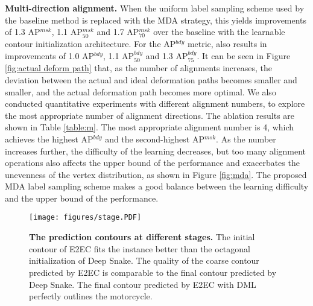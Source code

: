 \documentclass[10pt,twocolumn,letterpaper]{article}
\begin{document}
\textbf{Multi-direction alignment.} When the uniform label sampling scheme used by the baseline method is replaced with the MDA strategy, this yields improvements of 1.3 AP$^{msk}$, 1.1 AP$_{50}^{msk}$ and 1.7 AP$_{70}^{msk}$ over the baseline with the learnable contour initialization architecture. For the AP$^{bdy}$ metric, also results in improvements of 1.0 AP$^{bdy}$, 1.1 AP$_{50}^{bdy}$ and 1.3 AP$_{75}^{bdy}$. It can be seen in Figure \ref{fig:actual deform path} that, as the number of alignments increases, the deviation between the actual and ideal deformation paths becomes smaller and smaller, and the actual deformation path becomes more optimal. We also conducted quantitative experiments with different alignment numbers, to explore the most appropriate number of alignment directions. The ablation results are shown in Table \ref{table:m}. The most appropriate alignment number is 4, which achieves the highest AP$^{bdy}$ and the second-highest AP$^{msk}$. As the number increases further, the difficulty of the learning decreases, but too many alignment operations also affects the upper bound of the performance and exacerbates the unevenness of the vertex distribution, as shown in Figure \ref{fig:mda}. The proposed MDA label sampling scheme makes a good balance between the learning difficulty and the upper bound of the performance.
\begin{figure*}[t]
  \centering
\begin{small}
\vspace{-1mm}\texttt{[image: figures/stage.PDF]}\vspace{-3mm}
   \caption{\textbf{The prediction contours at different stages.} The initial contour of E2EC fits the instance better than the octagonal initialization of Deep Snake. The quality of the coarse contour predicted by E2EC is comparable to the final contour predicted by Deep Snake. The final contour predicted by E2EC with DML perfectly outlines the motorcycle.}
   \label{fig:stage}\vspace{-4mm}
\end{small}
\end{figure*}
\end{document}
